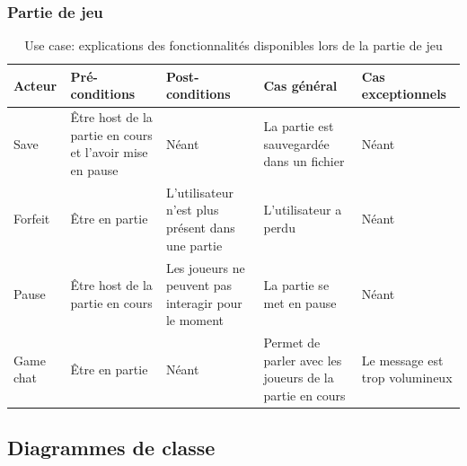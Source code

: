 \documentclass[a4paper,10pt]{article}
\begin{document}
\subsubsection{Partie de jeu}
\begin{table}[H]
\begin{tabular}{|p{3.5cm}|p{3cm}|p{3cm}|p{3cm}|p{3cm}|}
\hline
\textbf{Acteur} & \textbf{Pré-conditions} & \textbf{Post-conditions} & \textbf{Cas général}& \textbf{Cas exceptionnels} \\
\hline
Save & Être host de la partie en cours et l'avoir mise en pause & Néant  & La partie est sauvegardée dans un fichier & Néant\\
\hline
Forfeit & Être en partie & L'utilisateur n'est plus présent dans une partie & L'utilisateur a perdu &Néant\\
\hline
Pause & Être host de la partie en cours & Les joueurs ne peuvent pas interagir pour le moment& La partie se met en pause & Néant\\
\hline
	Game chat & Être en partie & Néant & Permet de parler avec les joueurs de la partie en cours & Le message est trop volumineux\\
\hline

\end{tabular}
	\caption{Use case: explications des fonctionnalités disponibles lors de la partie de jeu}
\end{table}


\newpage

\subsection{Diagrammes de classe}
\end{document}
